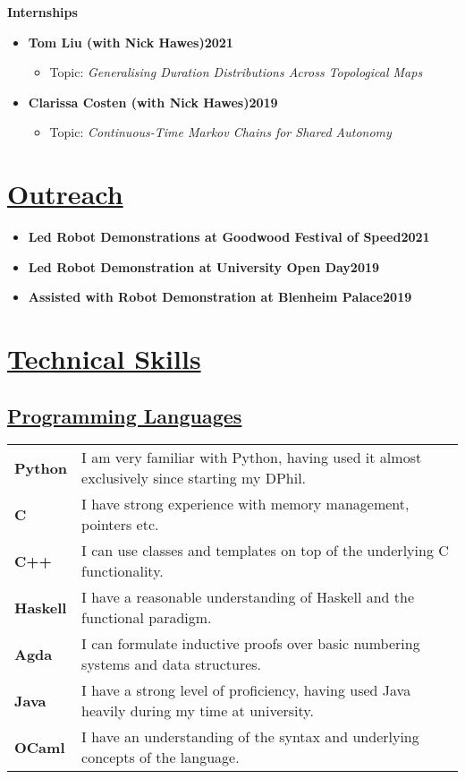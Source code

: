 \documentclass[11pt]{article}
\begin{document}
\noindent \textbf{Internships}	
\begin{itemize}
\item \textbf{Tom Liu (with Nick Hawes)\hfill 2021}
\begin{itemize}
\item Topic: \emph{Generalising Duration Distributions Across Topological Maps}
\end{itemize}
\item \textbf{Clarissa Costen (with Nick Hawes)\hfill 2019}
\begin{itemize}
\item Topic: \emph{Continuous-Time Markov Chains for Shared Autonomy}
\end{itemize}
\end{itemize}

\section*{\underline{Outreach}}
\begin{itemize}
\item \textbf{Led Robot Demonstrations at Goodwood Festival of Speed\hfill 2021}
\item \textbf{Led Robot Demonstration at University Open Day\hfill 2019}
\item \textbf{Assisted with Robot Demonstration at Blenheim Palace\hfill 2019}
\end{itemize}


\iffalse
	\section*{\underline{Technical Skills}}
		\subsection*{\underline{Programming Languages}}
		\renewcommand{\arraystretch}{1.3}%
		\begin{tabular}[20pt]{ll}
		        \textbf{Python} & I am very familiar with Python, having used it almost exclusively since starting my DPhil. \\
			\textbf{C} & I have strong experience with memory management, pointers etc. \\
			\textbf{C++} & I can use classes and templates on top of the underlying C functionality. \\
			\textbf{Haskell} & I have a reasonable understanding of Haskell and the functional paradigm.\\
			\textbf{Agda} & I can formulate inductive proofs over basic numbering systems and data structures.\\
			 \textbf{Java} &  I have a strong level of proficiency, having used Java heavily during my time at university.\\
			 \textbf{OCaml} & I have an understanding of the syntax and underlying concepts of the language.\\
		\end{tabular} 
\end{document}
